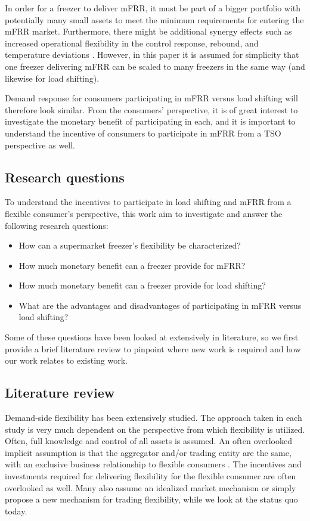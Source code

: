 In order for a freezer to deliver mFRR, it must be part of a bigger portfolio with potentially many small assets to meet the minimum requirements for entering the mFRR market. Furthermore, there might be additional synergy effects such as increased operational flexibility in the control response, rebound, and temperature deviations \cite{koch2011modeling}. However, in this paper it is assumed for simplicity that one freezer delivering mFRR can be scaled to many freezers in the same way (and likewise for load shifting).

Demand response for consumers participating in mFRR versus load shifting will therefore look similar. From the consumers' perspective, it is of great interest to investigate the monetary benefit of participating in each, and it is important to understand the incentive of consumers to participate in mFRR from a TSO perspective as well.

\subsection{Research questions}

To understand the incentives to participate in load shifting and mFRR from a flexible consumer's perspective, this work aim to investigate and answer the following research questions:

\begin{itemize}
    \item How can a supermarket freezer's flexibility be characterized?
    \item How much monetary benefit can a freezer provide for mFRR?
    \item How much monetary benefit can a freezer provide for load shifting?
    \item What are the advantages and disadvantages of participating in mFRR versus load shifting?
\end{itemize}

Some of these questions have been looked at extensively in literature, so we first provide a brief literature review to pinpoint where new work is required and how our work relates to existing work.

\subsection{Literature review}

Demand-side flexibility has been extensively studied. The approach taken in each study is very much dependent on the perspective from which flexibility is utilized. Often, full knowledge and control of all assets is assumed. An often overlooked implicit assumption is that the aggregator and/or trading entity are the same, with an exclusive business relationship to flexible consumers \cite{gade2022ecosystem}. The incentives and investments required for delivering flexibility for the flexible consumer are often overlooked as well. Many also assume an idealized market mechanism or simply propose a new mechanism for trading flexibility, while we look at the status quo today.

